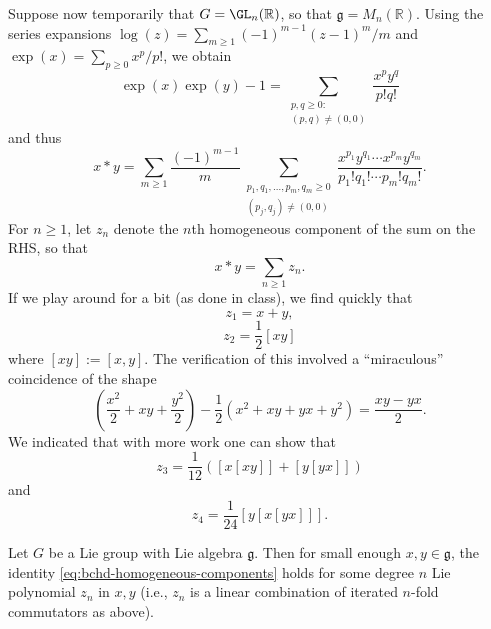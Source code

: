 \documentclass[reqno]{amsart} 
\begin{document}
Suppose now temporarily that $G = \GL_n(\mathbb{R})$, so that $\mathfrak{g} = M_n(\mathbb{R})$.  Using the series expansions $\log(z) = \sum_{m \geq 1} (-1)^{m-1} (z-1)^m/m$ and $\exp(x) = \sum_{p \geq 0} x^p/p!$, we obtain
\begin{equation*}
  \exp(x) \exp(y) - 1 = \sum _{\substack{
      p,q \geq 0: \\
      (p,q) \neq (0,0) } } \frac{x^p y^q}{p! q!}
\end{equation*}
and thus
\begin{equation}\label{eq:BCHD-naive}
  x \ast y
  = \sum_{m \geq 1}
  \frac{(-1)^{m-1}}{m}
  \sum _{\substack{
      p_1,q_1,\dotsc,p_m,q_m \geq 0  \\  
      (p_j,q_j) \neq (0,0)
    }
  }
  \frac{x^{p_1} y^{q_1} \dotsb x^{p_m} y^{q_m}}{
    p_1! q_1! \dotsb p_m! q_m!}.
\end{equation}
For $n \geq 1$, let $z_n$ denote the $n$th homogeneous component of the sum on the RHS, so that
\begin{equation}\label{eq:bchd-homogeneous-components}
  x \ast y = \sum_{n \geq 1} z_n.
\end{equation}
If we play around for a bit (as done in class), we find quickly that
\begin{equation*}
  z_1 = x + y,
\end{equation*}
\begin{equation*}
  z_2 = \frac{1}{2} [xy]
\end{equation*}
where $[x y] := [x,y]$.  The verification of this involved a ``miraculous'' coincidence of the shape
\begin{equation*}
  \left( \frac{x^2}{2} + x y + \frac{y^2}{2} \right) - \frac{1}{2} (x^2 + x y + y x + y^2) = \frac{x y - y x}{2}.
\end{equation*}
We indicated that with more work one can show that
\begin{equation*}
  z_3 = \frac{1}{12} ([x [x y]] + [y [y x]])
\end{equation*}
and
\begin{equation*}
  z_4 = \frac{1}{24} [y[x[yx]]].
\end{equation*}
\begin{theorem}\label{thm:BCH}
  Let $G$ be a Lie group with Lie algebra $\mathfrak{g}$.  Then for small enough $x,y \in \mathfrak{g}$, the identity \eqref{eq:bchd-homogeneous-components} holds for some degree $n$ Lie polynomial $z_n$ in $x,y$ (i.e., $z_n$ is a linear combination of iterated $n$-fold commutators as above).
\end{theorem}
\end{document}
